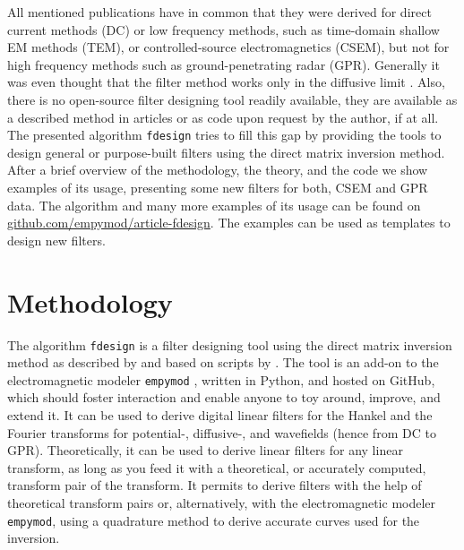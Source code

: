 \documentclass[paper,twocolumn,twoside]{geophysics}
\begin{document}

All mentioned publications have in common that they were derived for direct
current methods (DC) or low frequency methods, such as time-domain shallow EM
methods (TEM), or controlled-source electromagnetics (CSEM), but not for high
frequency methods such as ground-pe\-ne\-tra\-ting radar (GPR). Generally it
was even thought that the filter method works only in the diffusive limit
\citep[e.g.,][]{GEO.15.Hunziker}. Also, there is no open-source filter
designing tool readily available, they are available as a described method
in articles or as code upon request by the author, if at all. The presented
algorithm \texttt{fdesign} tries to fill this gap by providing the tools to
design general or purpose-built filters using the direct matrix inversion
method. After a brief overview of the methodology, the theory, and the code we
show examples of its usage, presenting some new filters for both, CSEM and GPR
data. The algorithm and many more examples of its usage can be found on
\href{https://github.com/empymod/article-fdesign}{github.com/empymod/article-fdesign}.
The examples can be used as templates to design new filters.


\section{Methodology}

The algorithm \texttt{fdesign} is a filter designing tool using the direct
matrix inversion method as described by \cite{GP.07.Kong} and based on scripts
by \cite{GEO.12.Key}. The tool is an add-on to the electromagnetic modeler
\texttt{empymod} \citep{GEO.17.Werthmuller}, written in Python, and hosted on
GitHub, which should foster interaction and enable anyone to toy around,
improve, and extend it. It can be used to derive digital linear filters for the
Hankel and the Fourier transforms for potential-, diffusive-, and wavefields
(hence from DC to GPR). Theoretically, it can be used to derive linear filters
for any linear transform, as long as you feed it with a theoretical, or
accurately computed, transform pair of the transform. It permits to derive
filters with the help of theoretical transform pairs or, alternatively, with
the electromagnetic modeler \texttt{empymod}, using a quadrature method to
derive accurate curves used for the inversion.
\end{document}
